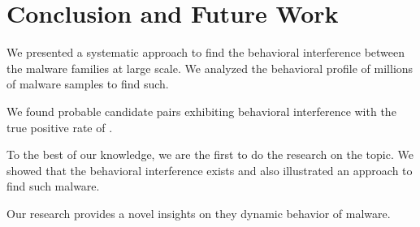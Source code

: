 \chapter{Conclusion and Future Work}\label{chapter:conclusion_and_future_work}
We presented a systematic approach to find the behavioral interference between the malware families at large scale.
We analyzed the behavioral profile of millions of malware samples to find such.

We found {\gettotalcandidatepairs{}} probable candidate pairs exhibiting behavioral interference with the true positive rate of {\gettruepositiverate{}}.

To the best of our knowledge, we are the first to do the research on the topic.
We showed that the behavioral interference exists and also illustrated an approach to find such malware.

Our research provides a novel insights on they dynamic behavior of malware.

